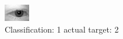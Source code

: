 \begin{figure}[h!]
\begin{center}
\includegraphics[width=0.60\columnwidth]{figures/ID496_class_1_target_2.png}
\end{center}
\caption{ Classification: 1 actual target: 2}
\label{fig:ID496_class_1_target_2}
\end{figure}
